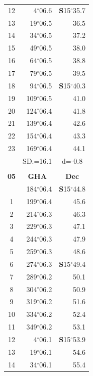 \documentclass[10pt, a4paper]{report}
\begin{document}
\begin{scriptsize}
\begin{tabular*}{0.2\textwidth}[t]{@{\extracolsep{\fill}}|c|rr|}
12 & 4$^\circ$06.6 & \textbf{S}15$^\circ$35.7\\
13 & 19$^\circ$06.5 & 36.5\\
14 & 34$^\circ$06.5 & 37.2\\
15 & 49$^\circ$06.5 & \raisebox{0.24ex}{\boldmath$\cdot$~\boldmath$\cdot$~~}38.0\\
16 & 64$^\circ$06.5 & 38.8\\
17 & 79$^\circ$06.5 & 39.5\\[2Pt]
18 & 94$^\circ$06.5 & \textbf{S}15$^\circ$40.3\\
19 & 109$^\circ$06.5 & 41.0\\
20 & 124$^\circ$06.4 & 41.8\\
21 & 139$^\circ$06.4 & \raisebox{0.24ex}{\boldmath$\cdot$~\boldmath$\cdot$~~}42.6\\
22 & 154$^\circ$06.4 & 43.3\\
23 & 169$^\circ$06.4 & 44.1\\
\hline
\rule{0pt}{2.4ex} & \multicolumn{1}{c}{SD.=16.1} & \multicolumn{1}{c|}{d=-0.8}\\
\hline
\multicolumn{1}{c}{}\\[-0.5ex]\hline
\multicolumn{1}{|c|}{\rule{0pt}{2.6ex}\textbf{05}} & \multicolumn{1}{c}{\textbf{GHA}} & \multicolumn{1}{c|}{\textbf{Dec}}\\
\hline\rule{0pt}{2.6ex}\noindent
0 & 184$^\circ$06.4 & \textbf{S}15$^\circ$44.8\\
1 & 199$^\circ$06.4 & 45.6\\
2 & 214$^\circ$06.3 & 46.3\\
3 & 229$^\circ$06.3 & \raisebox{0.24ex}{\boldmath$\cdot$~\boldmath$\cdot$~~}47.1\\
4 & 244$^\circ$06.3 & 47.9\\
5 & 259$^\circ$06.3 & 48.6\\[2Pt]
6 & 274$^\circ$06.3 & \textbf{S}15$^\circ$49.4\\
7 & 289$^\circ$06.2 & 50.1\\
8 & 304$^\circ$06.2 & 50.9\\
9 & 319$^\circ$06.2 & \raisebox{0.24ex}{\boldmath$\cdot$~\boldmath$\cdot$~~}51.6\\
10 & 334$^\circ$06.2 & 52.4\\
11 & 349$^\circ$06.2 & 53.1\\[2Pt]
12 & 4$^\circ$06.1 & \textbf{S}15$^\circ$53.9\\
13 & 19$^\circ$06.1 & 54.6\\
14 & 34$^\circ$06.1 & 55.4\\

\end{tabular*}
\end{scriptsize}
\end{document}
